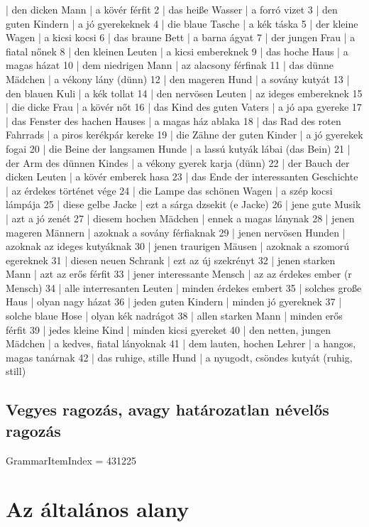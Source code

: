 \documentclass{article}
\newenvironment{exmp}{\verbatim}{\endverbatim}
\begin{document}
\begin{exmp}
1 | den dicken Mann | a kövér férfit
2 | das heiße Wasser | a forró vizet
3 | den guten Kindern | a jó gyerekeknek
4 | die blaue Tasche | a kék táska
5 | der kleine Wagen | a kicsi kocsi
6 | das braune Bett | a barna ágyat
7 | der jungen Frau | a fiatal nőnek
8 | den kleinen Leuten | a kicsi embereknek
9 | das hoche Haus | a magas házat
10 | dem niedrigen Mann | az alacsony férfinak
11 | das dünne Mädchen | a vékony lány (dünn)
12 | den mageren Hund | a sovány kutyát
13 | den blauen Kuli | a kék tollat
14 | den nervösen Leuten | az ideges embereknek
15 | die dicke Frau | a kövér nőt
16 | das Kind des guten Vaters | a jó apa gyereke
17 | das Fenster des hachen Hauses | a magas ház ablaka
18 | das Rad des roten Fahrrads | a piros kerékpár kereke
19 | die Zähne der guten Kinder | a jó gyerekek fogai
20 | die Beine der langsamen Hunde | a lassú kutyák lábai (das Bein)
21 | der Arm des dünnen Kindes | a vékony gyerek karja (dünn)
22 | der Bauch der dicken Leuten | a kövér emberek hasa
23 | das Ende der interessanten Geschichte | az érdekes történet vége
24 | die Lampe das schönen Wagen | a szép kocsi lámpája
25 | diese gelbe Jacke | ezt a sárga dzsekit (e Jacke)
26 | jene gute Musik | azt a jó zenét
27 | diesem hochen Mädchen | ennek a magas lánynak
28 | jenen mageren Männern | azoknak a sovány férfiaknak
29 | jenen nervösen Hunden | azoknak az ideges kutyáknak
30 | jenen traurigen Mäusen | azoknak a szomorú egereknek
31 | diesen neuen Schrank | ezt az új szekrényt
32 | jenen starken Mann | azt az erős férfit
33 | jener interessante Mensch | az az érdekes ember (r Mensch)
34 | alle interresanten Leuten | minden érdekes embert
35 | solches große Haus | olyan nagy házat
36 | jeden guten Kindern | minden jó gyereknek
37 | solche blaue Hose | olyan kék nadrágot
38 | allen starken Mann | minden erős férfit
39 | jedes kleine Kind | minden kicsi gyereket
40 | den netten, jungen Mädchen | a kedves, fiatal lányoknak
41 | dem lauten, hochen Lehrer | a hangos, magas tanárnak
42 | das ruhige, stille Hund | a nyugodt, csöndes kutyát (ruhig, still)
\end{exmp}

\subsection{Vegyes ragozás, avagy határozatlan névelős ragozás}

GrammarItemIndex = 431225

\section{Az általános alany}
\end{document}
